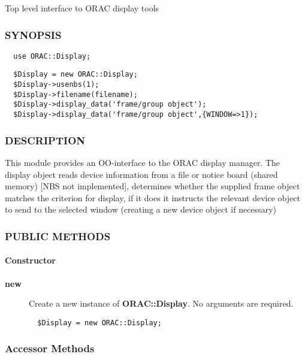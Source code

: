 \begin{description}
Top level interface to ORAC display tools

\subsubsection*{SYNOPSIS\label{ORAC::Display_SYNOPSIS}}
\begin{verbatim}
  use ORAC::Display;
\end{verbatim}
\begin{verbatim}
  $Display = new ORAC::Display;
  $Display->usenbs(1);
  $Display->filename(filename);
  $Display->display_data('frame/group object');
  $Display->display_data('frame/group object',{WINDOW=>1});
\end{verbatim}
\subsubsection*{DESCRIPTION\label{ORAC::Display_DESCRIPTION}}


This module provides an OO-interface to the ORAC display manager.  The
display object reads device information from a file or notice board
(shared memory) [NBS not implemented], determines whether the supplied
frame object matches the criterion for display, if it does it
instructs the relevant device object to send to the selected window
(creating a new device object if necessary)

\subsubsection*{PUBLIC METHODS\label{ORAC::Display_PUBLIC_METHODS}}
\paragraph*{Constructor\label{ORAC::Display_Constructor}}
\begin{description}

\item[{\textbf{new}}] \mbox{}

Create a new instance of \textbf{ORAC::Display}. No arguments are
required.

\begin{verbatim}
  $Display = new ORAC::Display;
\end{verbatim}
\end{description}
\subsubsection*{Accessor Methods\label{ORAC::Display_Accessor_Methods}}
\begin{description}


\end{description}
\end{description}
